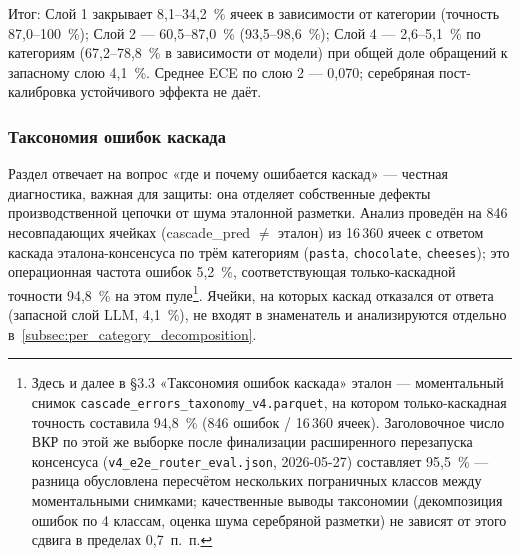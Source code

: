 Итог: Слой 1 закрывает 8,1--34,2~\% ячеек в зависимости от категории (точность 87,0--100~\%); Слой 2 — 60,5--87,0~\% (93,5--98,6~\%); Слой 4 — 2,6--5,1~\% по категориям (67,2--78,8~\% в зависимости от модели) при общей доле обращений к запасному слою 4,1~\%. Среднее ECE по слою 2 — 0,070; серебряная пост-калибровка устойчивого эффекта не даёт.

\subsubsection{Таксономия ошибок каскада}
\label{sec:failure-taxonomy}

Раздел отвечает на вопрос «где и почему ошибается каскад» --- честная диагностика, важная для защиты: она отделяет собственные дефекты производственной цепочки от шума эталонной разметки. Анализ проведён на 846 несовпадающих ячейках (cascade\_pred $\neq$ эталон) из 16\,360 ячеек с ответом каскада эталона-консенсуса по трём категориям (\texttt{pasta}, \texttt{chocolate}, \texttt{cheeses}); это операционная частота ошибок 5,2~\%, соответствующая только-каскадной точности 94,8~\% на этом пуле\footnote{Здесь и далее в \S3.3 «Таксономия ошибок каскада» эталон --- моментальный снимок \texttt{cascade\_errors\_taxonomy\_v4.parquet}, на котором только-каскадная точность составила 94,8~\% (846 ошибок / 16\,360 ячеек). Заголовочное число ВКР по этой же выборке после финализации расширенного перезапуска консенсуса (\texttt{v4\_e2e\_router\_eval.json}, 2026-05-27) составляет 95,5~\% --- разница обусловлена пересчётом нескольких пограничных классов между моментальными снимками; качественные выводы таксономии (декомпозиция ошибок по 4 классам, оценка шума серебряной разметки) не зависят от этого сдвига в пределах 0,7~п.~п.}. Ячейки, на которых каскад отказался от ответа (запасной слой LLM, 4,1~\%), не входят в знаменатель и анализируются отдельно в~\ref{subsec:per_category_decomposition}.

